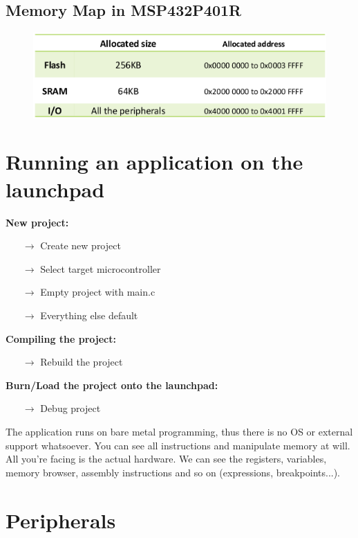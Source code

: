 \subsection{Memory Map in MSP432P401R}

\begin{figure}[H]
    \centering
    \includegraphics[width=0.6\linewidth]{img/image54.png}
\end{figure}

\section{Running an application on the launchpad}

\textbf{New project:}
    \begin{itemize}
        \item[$\rightarrow$] Create new project
        \item[$\rightarrow$] Select target microcontroller
        \item[$\rightarrow$] Empty project with main.c
        \item[$\rightarrow$] Everything else default
    \end{itemize}
\textbf{Compiling the project:}
    \begin{itemize}
        \item[$\rightarrow$] Rebuild the project
    \end{itemize}
\textbf{Burn/Load the project onto the launchpad:}
\begin{itemize}
        \item[$\rightarrow$] Debug project
    \end{itemize}

    The application runs on bare metal programming, thus there is no OS or external support whatsoever.
You can see all instructions and manipulate memory at will. All you're facing is the actual hardware. We
can see the registers, variables, memory browser, assembly instructions and so on (expressions,
breakpoints...).

\section{Peripherals}


